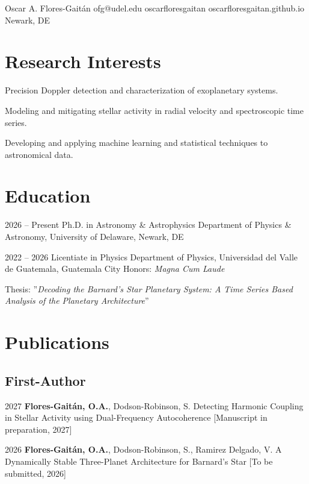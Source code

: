 \documentclass[11pt, a4paper]{article}
\begin{document}
\rubenzahlHeader
    {Oscar A. Flores-Gaitán}
    {ofg@udel.edu}
    {}
    {oscarfloresgaitan}
    {oscarfloresgaitan.github.io}
    {Newark, DE}

\section{Research Interests}
\begin{highlights}
    \item Precision Doppler detection and characterization of exoplanetary systems.
    \item Modeling and mitigating stellar activity in radial velocity and spectroscopic time series.
    \item Developing and applying machine learning and statistical techniques to astronomical data.
\end{highlights}

\section{Education}

\rubenzahlEntry
    {2026 – Present}
    {Ph.D. in Astronomy \& Astrophysics}
    {Department of Physics \& Astronomy, University of Delaware, Newark, DE}
    {}
    {}

\rubenzahlEntry
    {2022 – 2026}
    {Licentiate in Physics}
    {Department of Physics, Universidad del Valle de Guatemala, Guatemala City}
    {Honors: \textit{Magna Cum Laude}}
    {
        \item Thesis: ''\textit{Decoding the Barnard's Star Planetary System: A Time Series Based Analysis of the Planetary Architecture}''
    }

\section{Publications}

\subsection*{First-Author}
\rubenzahlPub
    {2027}
    {\textbf{Flores-Gaitán, O.A.}, Dodson-Robinson, S.}
    {Detecting Harmonic Coupling in Stellar Activity using Dual-Frequency Autocoherence}
    {[Manuscript in preparation, 2027]}

\rubenzahlPub
    {2026}
    {\textbf{Flores-Gaitán, O.A.}, Dodson-Robinson, S., Ramirez Delgado, V.}
    {A Dynamically Stable Three-Planet Architecture for Barnard's Star}
    {[To be submitted, 2026]}
\end{document}
